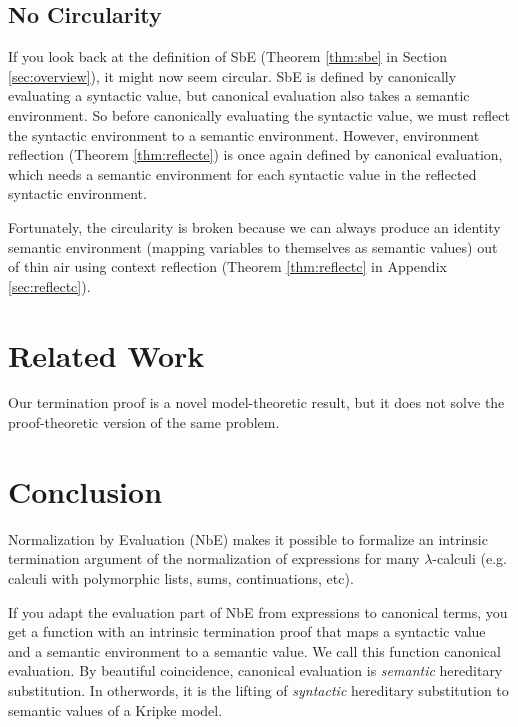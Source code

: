 \documentclass{llncs}
\newcommand{\refthm}[1]{Theorem \ref{thm:#1}}
\newcommand{\refapp}[1]{Appendix \ref{sec:#1}}
\newcommand{\refsec}[1]{Section \ref{sec:#1}}
\begin{document}
\subsection{No Circularity}

If you look back at the definition of SbE (\refthm{sbe} in
\refsec{overview}), it might now seem circular. SbE is defined by
canonically evaluating a syntactic value, but canonical evaluation
also takes a semantic environment. So before canonically evaluating
the syntactic value, we must reflect the syntactic environment to a
semantic environment. However, environment reflection (\refthm{reflecte}) is once again
defined by canonical evaluation, which needs a semantic environment
for each syntactic value in the reflected syntactic environment.

Fortunately, the circularity is broken because we can always produce
an identity semantic environment (mapping variables to themselves as
semantic values) out of thin air using context reflection
(\refthm{reflectc} in \refapp{reflectc}).

\section{Related Work}
\label{sec:related}

Our termination proof is a novel model-theoretic result, but it
does not solve the proof-theoretic version of the same problem.


\section{Conclusion}
\label{sec:conclusion}

Normalization by Evaluation (NbE) makes it possible to formalize an
intrinsic termination argument of the normalization of expressions for
many $\lambda$-calculi (e.g. calculi with polymorphic lists, sums,
continuations, etc). 

If you adapt the evaluation part of NbE from expressions to canonical
terms, you get a function with an intrinsic termination proof that
maps a syntactic value and a semantic environment to a semantic value.
We call this function canonical evaluation. By beautiful coincidence,
canonical evaluation is \textit{semantic} hereditary substitution. In
otherwords, it is the
lifting of \textit{syntactic} hereditary substitution to semantic values of a
Kripke model.
\end{document}

